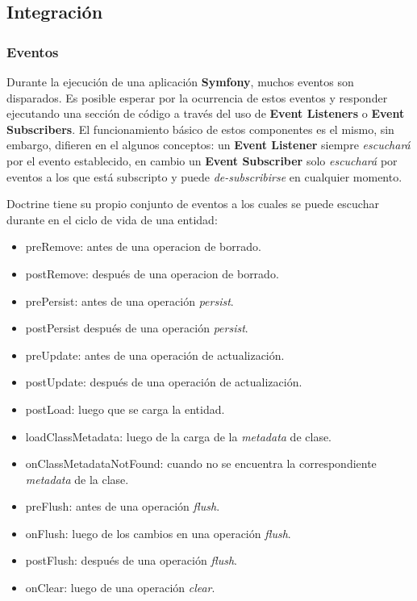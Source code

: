 \subsection{Integración}

\subsubsection{Eventos}%
\label{ssub:eventos}


Durante la ejecución de una aplicación \textbf{Symfony}, muchos eventos son disparados\@. Es posible esperar por la ocurrencia de estos eventos y responder ejecutando una sección de código a través del
uso de \textbf{Event Listeners} o \textbf{Event Subscribers}\@. El funcionamiento básico de estos componentes es el mismo, sin embargo, difieren en el algunos conceptos:
un \textbf{Event Listener} siempre \textit{escuchará} por el evento establecido, en cambio un \textbf{Event Subscriber} solo \textit{escuchará} por eventos a los que está subscripto
y puede \textit{de-subscribirse} en cualquier momento.


Doctrine tiene su propio conjunto de eventos a los cuales se puede escuchar durante en el ciclo de vida de una entidad:

\begin{itemize}
    \item preRemove: antes de una operacion de borrado.
    \item postRemove: después de una operacion de borrado.
    \item prePersist: antes de una operación \textit{persist}.
    \item postPersist después de una operación \textit{persist}.
    \item preUpdate: antes de una operación de actualización.
    \item postUpdate: después de una operación de actualización.
    \item postLoad: luego que se carga la entidad.
    \item loadClassMetadata: luego de la carga de la \textit{metadata} de clase.
    \item onClassMetadataNotFound: cuando no se encuentra la correspondiente \textit{metadata} de la clase.
    \item preFlush: antes de una operación \textit{flush}.
    \item onFlush: luego de los cambios en una operación \textit{flush}.
    \item postFlush: después de una operación \textit{flush}.
    \item onClear: luego de una operación \textit{clear}.
\end{itemize}

